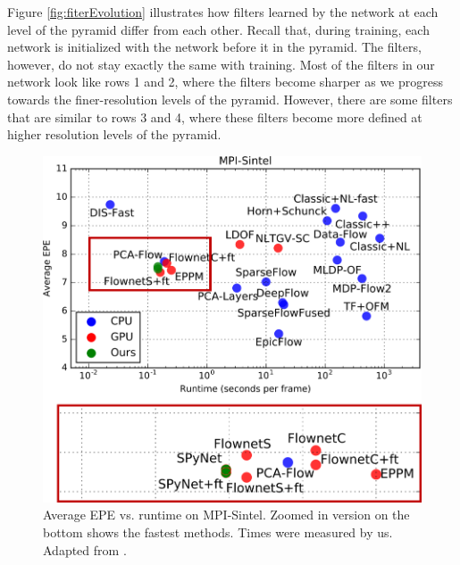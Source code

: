 \documentclass[10pt,twocolumn,letterpaper]{article}
\begin{document}
Figure \ref{fig:fiterEvolution} illustrates how filters learned by the network at each level of the pyramid differ from each other. 
Recall that, during training, each network is initialized with the network before it in the pyramid.
The filters, however, do not stay exactly the same with training.
Most of the filters in our network look like rows 1 and 2, where the filters become sharper as we progress towards the finer-resolution levels of the pyramid. 
However, there are some filters that are similar to rows 3 and 4, where these filters become more defined at higher resolution levels of the pyramid. 



\begin{figure}[t]
\centerline{
   \includegraphics[width=0.8\linewidth]{epevtime2.png}
}
   \caption{Average EPE vs. runtime on MPI-Sintel. 
Zoomed in version on the bottom shows the fastest methods. Times were measured by us. Adapted from \cite{wulff2015efficient}. }
\label{fig:epevtime}
\end{figure}
\end{document}
